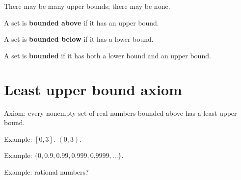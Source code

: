 \documentclass[12pt]{article}
\begin{document}
There may be many upper bounds; there may be none.

A set is \textbf{bounded above} if it has an upper bound.

A set is \textbf{bounded below} if it has a lower bound.

A set is \textbf{bounded} if it has both a lower bound and an upper bound.

\section{Least upper bound axiom}

Axiom: every nonempty set of real numbers bounded above has a least
upper bound.

Example: $[0,3]$.  $(0,3)$.

Example: $\{0, 0.9, 0.99, 0.999, 0.9999, \ldots\}$.

Example: rational numbers?
\end{document}
